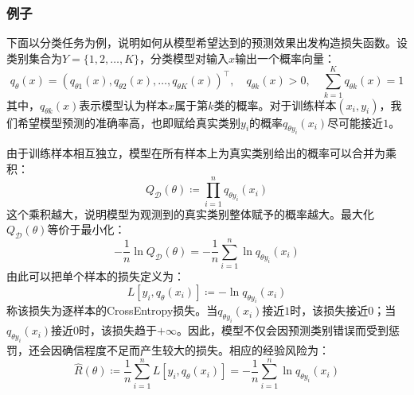 \subsubsection{例子}
下面以分类任务为例，说明如何从模型希望达到的预测效果出发构造损失函数。设类别集合为$Y=\{1,2,\dots,K\}$，分类模型对输入$x$输出一个概率向量：
\begin{equation*}
	q_\theta(x)=(q_{\theta1}(x),q_{\theta2}(x),\dots,q_{\theta K}(x))^{\top},\quad
	q_{\theta k}(x)>0,\quad\sum_{k=1}^{K}q_{\theta k}(x)=1
\end{equation*}
其中，$q_{\theta k}(x)$表示模型认为样本$x$属于第$k$类的概率。对于训练样本$(x_i,y_i)$，我们希望模型预测的准确率高，也即赋给真实类别$y_i$的概率$q_{\theta y_i}(x_i)$尽可能接近$1$。\par
由于训练样本相互独立，模型在所有样本上为真实类别给出的概率可以合并为乘积：
\begin{equation*}
	Q_{\mathcal{D}}(\theta)\coloneq\prod_{i=1}^{n}q_{\theta y_i}(x_i)
\end{equation*}
这个乘积越大，说明模型为观测到的真实类别整体赋予的概率越大。最大化$Q_{\mathcal{D}}(\theta)$等价于最小化：
\begin{equation*}
	-\frac{1}{n}\ln Q_{\mathcal{D}}(\theta)=-\frac{1}{n}\sum_{i=1}^{n}\ln q_{\theta y_i}(x_i)
\end{equation*}
由此可以把单个样本的损失定义为：
\begin{equation*}
	L[y_i,q_\theta(x_i)]\coloneq-\ln q_{\theta y_i}(x_i)
\end{equation*}
称该损失为逐样本的\gls{CrossEntropy}损失。当$q_{\theta y_i}(x_i)$接近$1$时，该损失接近$0$；当$q_{\theta y_i}(x_i)$接近$0$时，该损失趋于$+\infty$。因此，模型不仅会因预测类别错误而受到惩罚，还会因确信程度不足而产生较大的损失。相应的经验风险为：
\begin{equation*}
	\hat{R}(\theta)\coloneq\frac{1}{n}\sum_{i=1}^{n}L[y_i,q_\theta(x_i)]=-\frac{1}{n}\sum_{i=1}^{n}\ln q_{\theta y_i}(x_i)
\end{equation*}
